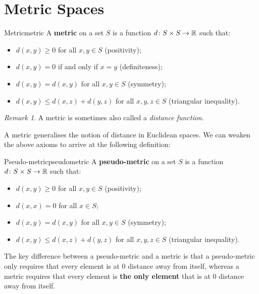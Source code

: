 \documentclass[math, code]{amznotes}
\theoremstyle{remark}
\newtheorem*{remark}{Remark}
\begin{document}
\section{Metric Spaces}
\begin{dfnbox}{Metric}{metric}
    A {\color{red} \textbf{metric}} on a set $S$ is a function $d \colon S \times S \to \mathbb{R}$ such that:
    \begin{itemize}
        \item $d\left(x, y\right) \geq 0$ for all $x, y \in S$ (positivity);
        \item $d\left(x, y\right) = 0$ if and only if $x = y$ (definiteness);
        \item $d\left(x, y\right) = d\left(x, y\right)$ for all $x, y \in S$ (symmetry);
        \item $d\left(x, y\right) \leq d\left(x, z\right) + d\left(y, z\right)$ for all $x, y, z \in S$ (triangular inequality).
    \end{itemize}
\end{dfnbox}
\begin{notebox}
    \begin{remark}
        A metric is sometimes also called a \textit{distance function}.
    \end{remark}
\end{notebox}
A metric generalises the notion of distance in Euclidean spaces. We can weaken the above axioms to arrive at the following definition:
\begin{dfnbox}{Pseudo-metric}{pseudometric}
    A {\color{red} \textbf{pseudo-metric}} on a set $S$ is a function $d \colon S \times S \to \mathbb{R}$ such that:
    \begin{itemize}
        \item $d\left(x, y\right) \geq 0$ for all $x, y \in S$ (positivity);
        \item $d\left(x, x\right) = 0$ for all $x \in S$;
        \item $d\left(x, y\right) = d\left(x, y\right)$ for all $x, y \in S$ (symmetry);
        \item $d\left(x, y\right) \leq d\left(x, z\right) + d\left(y, z\right)$ for all $x, y, z \in S$ (triangular inequality).
    \end{itemize}
\end{dfnbox}
The key difference between a pseudo-metric and a metric is that a pseudo-metric only requires that every element is at $0$ distance away from itself, whereas a metric requires that every element is \textbf{the only element} that is at $0$ distance away from itself.
\end{document}
